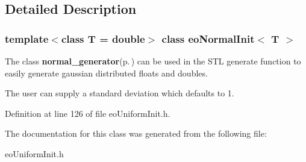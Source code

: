 \subsection{Detailed Description}
\subsubsection*{template$<$class T = double$>$ class eo\-Normal\-Init$<$ T $>$}

The class {\bf normal\_\-generator}{\rm (p.\,\pageref{classnormal__generator})} can be used in the STL generate function to easily generate gaussian distributed floats and doubles. 

The user can supply a standard deviation which defaults to 1. 



Definition at line 126 of file eo\-Uniform\-Init.h.

The documentation for this class was generated from the following file:\begin{CompactItemize}
\item 
eo\-Uniform\-Init.h\end{CompactItemize}

